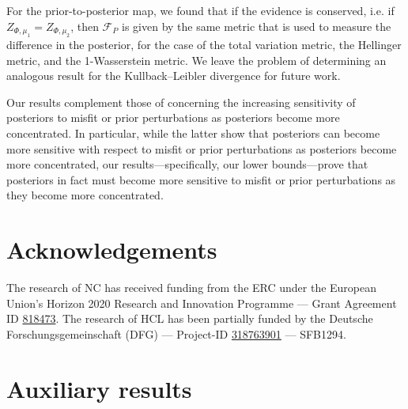 \documentclass[a4paper]{scrartcl}
\theoremstyle{definition}
\numberwithin{equation}{section}
\begin{document}
For the prior-to-posterior map, we found that if the evidence is conserved, i.e. if $Z_{\Phi,\mu_1}=Z_{\Phi,\mu_2}$, then $\mathcal{F}_P$ is given by the same metric that is used to measure the difference in the posterior, for the case of the total variation metric, the Hellinger metric, and the 1-Wasserstein metric. 
We leave the problem of determining an analogous result for the Kullback--Leibler divergence for future work.

Our results complement those of \cite{Sprungk2020} concerning the increasing sensitivity of posteriors to misfit or prior perturbations as posteriors become more concentrated.
In particular, while the latter show that posteriors can become more sensitive with respect to misfit or prior perturbations as posteriors become more concentrated, our results---specifically, our lower bounds---prove that posteriors in fact must become more sensitive to misfit or prior perturbations as they become more concentrated. 

\section*{Acknowledgements}

The research of NC has received funding from the ERC under the European Union’s Horizon 2020 Research and Innovation Programme --- Grant Agreement ID \href{https://cordis.europa.eu/project/id/818473}{818473}. The research of HCL has been partially funded by the Deutsche Forschungsgemeinschaft (DFG) --- Project-ID \href{https://gepris.dfg.de/gepris/projekt/318763901}{318763901} --- SFB1294.




\appendix

\section{Auxiliary results}
\label{section_auxiliary_results}
\end{document}
